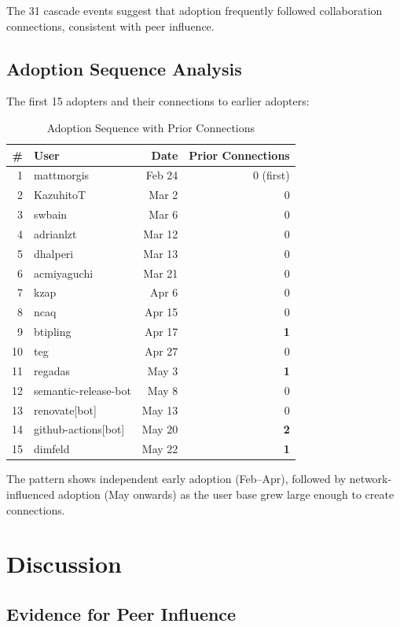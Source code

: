 \documentclass[11pt]{article}
\begin{document}
The 31 cascade events suggest that adoption frequently followed collaboration connections, consistent with peer influence.

\subsection{Adoption Sequence Analysis}

The first 15 adopters and their connections to earlier adopters:

\begin{table}[H]
\centering
\caption{Adoption Sequence with Prior Connections}
\label{tab:sequence}
\begin{tabular}{rlrr}
\toprule
\textbf{\#} & \textbf{User} & \textbf{Date} & \textbf{Prior Connections} \\
\midrule
1 & mattmorgis & Feb 24 & 0 (first) \\
2 & KazuhitoT & Mar 2 & 0 \\
3 & swbain & Mar 6 & 0 \\
4 & adrianlzt & Mar 12 & 0 \\
5 & dhalperi & Mar 13 & 0 \\
6 & acmiyaguchi & Mar 21 & 0 \\
7 & kzap & Apr 6 & 0 \\
8 & ncaq & Apr 15 & 0 \\
9 & btipling & Apr 17 & \textbf{1} \\
10 & teg & Apr 27 & 0 \\
11 & regadas & May 3 & \textbf{1} \\
12 & semantic-release-bot & May 8 & 0 \\
13 & renovate[bot] & May 13 & 0 \\
14 & github-actions[bot] & May 20 & \textbf{2} \\
15 & dimfeld & May 22 & \textbf{1} \\
\bottomrule
\end{tabular}
\end{table}

The pattern shows independent early adoption (Feb--Apr), followed by network-influenced adoption (May onwards) as the user base grew large enough to create connections.

\section{Discussion}

\subsection{Evidence for Peer Influence}
\end{document}
